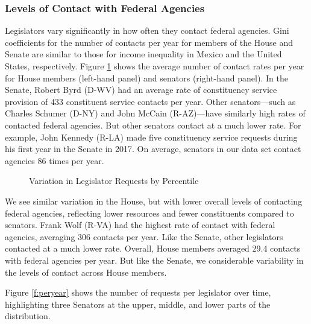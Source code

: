 \documentclass[12pt]{article}
\begin{document}
\subsubsection{Levels of Contact with Federal Agencies}
Legislators vary significantly in how often they contact federal agencies. Gini coefficients for the number of contacts per year for members of the House and Senate are similar to those for income inequality in Mexico and the United States, respectively. Figure \ref{f:contact1} shows the average number of contact rates per year for House members (left-hand panel) and senators (right-hand panel). 
In the Senate, Robert Byrd (D-WV) had an average rate of constituency service provision of 433 constituent service contacts per year. Other senators---such as Charles Schumer (D-NY) and John McCain (R-AZ)---have similarly high rates of contacted federal agencies. But other senators contact at a much lower rate. For example, John Kennedy (R-LA) made five constituency service requests during his first year in the Senate in 2017. On average, senators in our data set contact agencies 86 times per year.   
 
\begin{figure}
\centering
\caption{Variation in Legislator Requests by Percentile} \label{f:contact1} 
\begin{minipage}{\textwidth}
\end{minipage}
\end{figure}


We see similar variation in the House, but with lower overall levels of contacting federal agencies, reflecting lower resources and fewer constituents compared to senators. Frank Wolf (R-VA) had the highest rate of contact with federal agencies, averaging 306 contacts per year. Like the Senate, other legislators contacted at a much lower rate. Overall, House members averaged 29.4 contacts with federal agencies per year. But like the Senate, we considerable variability in the levels of contact across House members.  

Figure \ref{f:peryear} shows the number of requests per legislator over time, highlighting three Senators at the upper, middle, and lower parts of the distribution.
\end{document}
